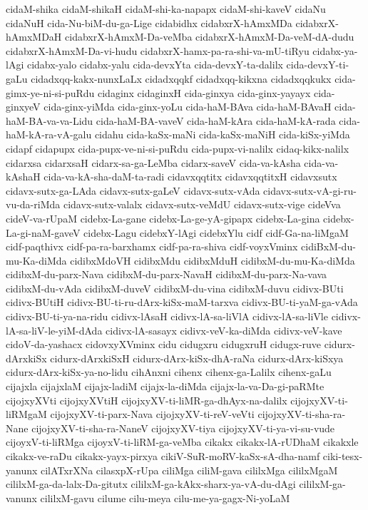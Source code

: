 {cidaM-shika
cidaM-shikaH
cidaM-shi-ka-napapx
cidaM-shi-kaveV
cidaNu
cidaNuH
cida-Nu-biM-du-ga-Lige
cidabidhx
cidabxrX-hAmxMDa
cidabxrX-hAmxMDaH
cidabxrX-hAmxM-Da-veMba
cidabxrX-hAmxM-Da-veM-dA-dudu
cidabxrX-hAmxM-Da-vi-hudu
cidabxrX-hamx-pa-ra-shi-va-mU-tiRyu
cidabx-ya-lAgi
cidabx-yalo
cidabx-yalu
cida-devxYta
cida-devxY-ta-dalilx
cida-devxY-ti-gaLu
cidadxqq-kakx-nunxLaLx
cidadxqqkf
cidadxqq-kikxna
cidadxqqkukx
cida-gimx-ye-ni-si-puRdu
cidaginx
cidaginxH
cida-ginxya
cida-ginx-yayayx
cida-ginxyeV
cida-ginx-yiMda
cida-ginx-yoLu
cida-haM-BAva
cida-haM-BAvaH
cida-haM-BA-va-va-Lidu
cida-haM-BA-vaveV
cida-haM-kAra
cida-haM-kA-rada
cida-haM-kA-ra-vA-galu
cidahu
cida-kaSx-maNi
cida-kaSx-maNiH
cida-kiSx-yiMda
cidapf
cidapupx
cida-pupx-ve-ni-si-puRdu
cida-pupx-vi-nalilx
cidaq-kikx-nalilx
cidarxsa
cidarxsaH
cidarx-sa-ga-LeMba
cidarx-saveV
cida-va-kAsha
cida-va-kAshaH
cida-va-kA-sha-daM-ta-radi
cidavxqqtitx
cidavxqqtitxH
cidavxsutx
cidavx-sutx-ga-LAda
cidavx-sutx-gaLeV
cidavx-sutx-vAda
cidavx-sutx-vA-gi-ru-vu-da-riMda
cidavx-sutx-valalx
cidavx-sutx-veMdU
cidavx-sutx-vige
cideVva
cideV-va-rUpaM
cidebx-La-gane
cidebx-La-ge-yA-gipapx
cidebx-La-gina
cidebx-La-gi-naM-gaveV
cidebx-Lagu
cidebxY-lAgi
cidebxYlu
cidf
cidf-Ga-na-liMgaM
cidf-paqthivx
cidf-pa-ra-barxhamx
cidf-pa-ra-shiva
cidf-voyxVminx
cidiBxM-du-mu-Ka-diMda
cidibxMdoVH
cidibxMdu
cidibxMduH
cidibxM-du-mu-Ka-diMda
cidibxM-du-parx-Nava
cidibxM-du-parx-NavaH
cidibxM-du-parx-Na-vava
cidibxM-du-vAda
cidibxM-duveV
cidibxM-du-vina
cidibxM-duvu
cidivx-BUti
cidivx-BUtiH
cidivx-BU-ti-ru-dArx-kiSx-maM-tarxva
cidivx-BU-ti-yaM-ga-vAda
cidivx-BU-ti-ya-na-ridu
cidivx-lAsaH
cidivx-lA-sa-liVlA
cidivx-lA-sa-liVle
cidivx-lA-sa-liV-le-yiM-dAda
cidivx-lA-sasayx
cidivx-veV-ka-diMda
cidivx-veV-kave
cidoV-da-yashacx
cidovxyXVminx
cidu
cidugxru
cidugxruH
cidugx-ruve
cidurx-dArxkiSx
cidurx-dArxkiSxH
cidurx-dArx-kiSx-dhA-raNa
cidurx-dArx-kiSxya
cidurx-dArx-kiSx-ya-no-lidu
cihAnxni
cihenx
cihenx-ga-Lalilx
cihenx-gaLu
cijajxla
cijajxlaM
cijajx-ladiM
cijajx-la-diMda
cijajx-la-va-Da-gi-paRMte
cijojxyXVti
cijojxyXVtiH
cijojxyXV-ti-liMR-ga-dhAyx-na-dalilx
cijojxyXV-ti-liRMgaM
cijojxyXV-ti-parx-Nava
cijojxyXV-ti-reV-veVti
cijojxyXV-ti-sha-ra-Nane
cijojxyXV-ti-sha-ra-NaneV
cijojxyXV-tiya
cijojxyXV-ti-ya-vi-su-vude
cijoyxV-ti-liRMga
cijoyxV-ti-liRM-ga-veMba
cikakx
cikakx-lA-rUDhaM
cikakxle
cikakx-ve-raDu
cikakx-yayx-pirxya
cikiV-SuR-moRV-kaSx-sA-dha-namf
ciki-tesx-yanunx
cilATxrXNa
cilasxpX-rUpa
ciliMga
ciliM-gava
cililxMga
cililxMgaM
cililxM-ga-da-lalx-Da-gitutx
cililxM-ga-kAkx-sharx-ya-vA-du-dAgi
cililxM-ga-vanunx
cililxM-gavu
cilume
cilu-meya
cilu-me-ya-gagx-Ni-yoLaM
}
